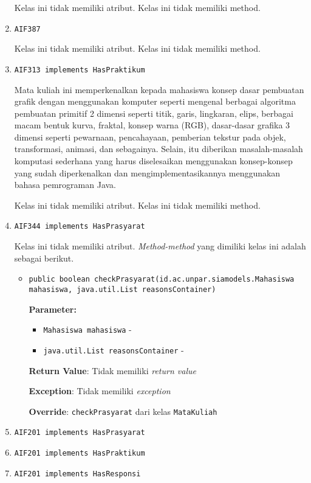 \documentclass{article}
\begin{document}
\begin{enumerate}
Kelas ini tidak memiliki atribut. Kelas ini tidak memiliki method. \item \texttt{AIF387}



Kelas ini tidak memiliki atribut. Kelas ini tidak memiliki method. \item \texttt{AIF313 implements HasPraktikum}

Mata kuliah ini memperkenalkan kepada mahasiswa konsep dasar pembuatan grafik
 dengan menggunakan komputer seperti mengenal berbagai algoritma pembuatan
 primitif 2 dimensi seperti titik, garis, lingkaran, elips, berbagai macam
 bentuk kurva, fraktal, konsep warna (RGB), dasar-dasar grafika 3 dimensi
 seperti pewarnaan, pencahayaan, pemberian tekstur pada objek, transformasi,
 animasi, dan sebagainya. Selain, itu diberikan masalah-masalah komputasi
 sederhana yang harus diselesaikan menggunakan konsep-konsep yang sudah
 diperkenalkan dan mengimplementasikannya menggunakan bahasa pemrograman Java.

Kelas ini tidak memiliki atribut. Kelas ini tidak memiliki method. \item \texttt{AIF344 implements HasPrasyarat}



Kelas ini tidak memiliki atribut. \textit{Method-method} yang dimiliki kelas ini adalah sebagai berikut.
\begin{itemize}
\item \texttt{public boolean checkPrasyarat(id.ac.unpar.siamodels.Mahasiswa mahasiswa, java.util.List reasonsContainer)}

\textbf{Parameter:}
\begin{itemize}
\item \texttt{Mahasiswa mahasiswa} - 
\item \texttt{java.util.List reasonsContainer} - 
\end{itemize}
\textbf{Return Value}: Tidak memiliki \textit{return value}

\textbf{Exception}: Tidak memiliki \textit{exception}

\textbf{Override}: \texttt{checkPrasyarat} dari kelas \texttt{MataKuliah}

\end{itemize}
\item \texttt{AIF201 implements HasPrasyarat}

\item \texttt{AIF201 implements HasPraktikum}

\item \texttt{AIF201 implements HasResponsi}


\end{enumerate}
\end{document}
